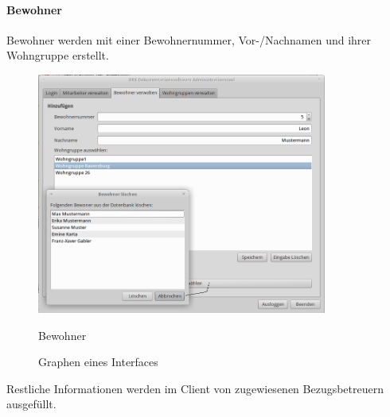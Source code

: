 \paragraph{Bewohner}
Bewohner werden mit einer Bewohnernummer, Vor-/Nachnamen und ihrer Wohngruppe  erstellt. 
\begin{figure}[h]
	\begin{center}
		\includegraphics[keepaspectratio=true, width=0.85\textwidth]{pics/admin2.png}
		\caption{Bewohner}
		\label{Admindialog Bewohner}
		\caption{Graphen eines Interfaces}
		\label{Admindialog_Bewohner}
	\end{center}
\end{figure}
\FloatBarrier
\noindent
Restliche Informationen werden im Client von zugewiesenen Bezugsbetreuern ausgefüllt.
\newpage
\noindent

